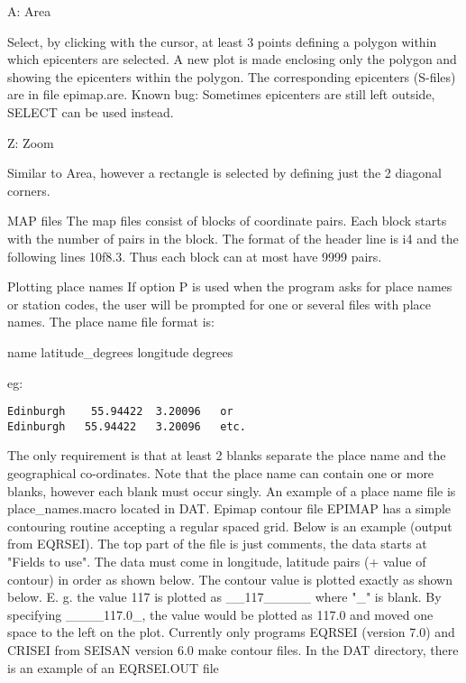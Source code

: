 A: Area 

Select, by clicking with the cursor, at least 3 points defining a polygon within which epicenters are selected. A new plot is made enclosing only the polygon and showing the epicenters within the polygon. The corresponding epicenters (S-files) are in file epimap.are. Known bug: Sometimes epicenters are still left outside, SELECT can be used instead. 

Z: Zoom 

Similar to Area, however a rectangle is selected by defining just the 2 diagonal corners. 

MAP files
The map files consist of blocks of coordinate pairs. Each block starts with the number of pairs in the block. The format of the header line is i4 and the following lines 10f8.3. Thus each block can at most have 9999 pairs.

Plotting place names If option P is used when the program asks for place names or station codes, the user will be prompted for one or several files with place names. The place name file format is: 

name latitude\_degrees longitude degrees 

eg: 

\begin{verbatim}
Edinburgh    55.94422  3.20096   or
Edinburgh   55.94422   3.20096   etc.
\end{verbatim}

The only requirement is that at least 2 blanks separate the place 
name and the geographical co-ordinates. Note that the place name 
can contain one or more blanks, however each blank must occur singly. 
An example of a place name file is place\_names.macro located in DAT.
Epimap contour file 
EPIMAP has a simple contouring routine accepting a regular spaced grid. Below is an example (output from EQRSEI). The top part of the file is just comments, the data starts at "Fields to use". The data must come in longitude, latitude pairs (+ value of contour) in order as shown below. The contour value is plotted exactly as shown below. E. g. the value 117 is plotted as \_\_117\_\_\_\_\_ where "\_" is blank. By specifying \_\_\_\_117.0\_, the value would be plotted as 117.0 and moved one space to the left on the plot. Currently only programs EQRSEI (version 7.0) and CRISEI from SEISAN version 6.0 make contour files. In the DAT directory, there is an example of an EQRSEI.OUT file 

